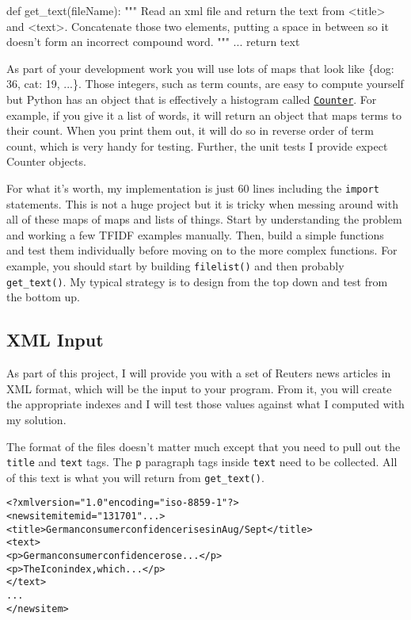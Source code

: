 \begin{fullwidth}
\begin{pyverbatim}
def get_text(fileName):
    """
    Read an xml file and return the text from <title> and <text>.
    Concatenate those two elements, putting a space in between so it doesn't
    form an incorrect compound word.    
    """
    ...
    return text
\end{pyverbatim}

As part of your development work you will use lots of maps that look like \{dog: 36, cat: 19, ...\}.   Those integers, such as term counts, are easy to compute yourself but Python has an object that is effectively a histogram called \href{https://docs.python.org/2/library/collections.html#collections.Counter}{{\tt Counter}}. For example, if you give it a list of words, it will return an object that maps terms to their count. When you print them out, it will do so in reverse order of term count, which is very handy for testing.  Further, the unit tests I provide expect Counter objects.

For what it's worth, my implementation is just 60 lines including the {\tt import} statements. This is not a huge project but it is tricky when messing around with all of these maps of maps and lists of things. Start by understanding the problem and working a few TFIDF examples manually. Then, build a simple functions and test them individually before moving on to the more complex functions. For example, you should start by building {\tt filelist()} and then probably {\tt get\_text()}. My typical strategy is to design from the top down and test from the bottom up.

\subsection{XML Input}

As part of this project, I will provide you with a set of Reuters news articles in XML format, which will be the input to your program. From it, you will create the appropriate indexes and I will test those values against what I computed with my solution.

The format of the files doesn't matter much except that you need to pull out the {\tt title} and {\tt text} tags. The {\tt p} paragraph tags inside {\tt text} need to be collected. All of this text is what you will return from {\tt get\_text()}.
 
\begin{alltt}
<?xml version="1.0" encoding="iso-8859-1" ?>
<newsitem itemid="131701" ...>
<title>German consumer confidence rises in Aug/Sept</title>
<text>
<p>German consumer confidence rose...</p>
<p>The Icon index, which...</p>
</text>
...
</newsitem>
\end{alltt}


\end{fullwidth}
